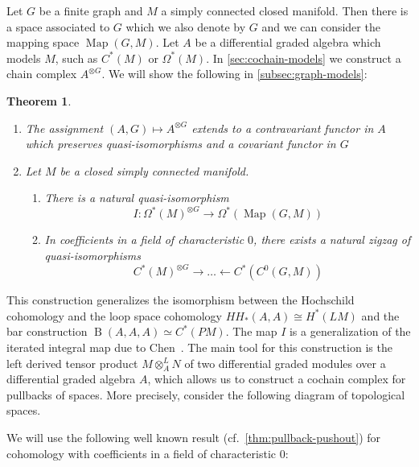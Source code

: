 \documentclass{scrartcl}
\theoremstyle{plain}
\newtheorem{theorem}{Theorem}[section]
\theoremstyle{definition}
\newcommand{\iso}{\cong}
\newcommand{\quiso}{\simeq}
\newcommand{\from}{\leftarrow}
\DeclareMathOperator{\Map}{Map}
\DeclareMathOperator{\BC}{B}
\begin{document}
Let $G$ be a finite graph and $M$ a simply connected closed manifold. Then there is a space associated to $G$ which we also denote by $G$ and we can consider the mapping space $\Map(G, M)$. Let $A$ be a differential graded algebra which models $M$, such as $C^*(M)$ or $\Omega^*(M)$. In \cref{sec:cochain-models} we construct a chain complex $A^{\otimes G}$. %
We will show the following in \cref{subsec:graph-models}: 
\begin{theorem}\label{thm:intro-graph-model}
    \begin{enumerate}
        \item The assignment $(A, G)\mapsto A^{\otimes G}$ extends to a contravariant functor in $A$ which preserves quasi-isomorphisms and a covariant functor in $G$ 
        \item Let $M$ be a closed simply connected manifold.
        \begin{enumerate}
            \item There is a natural quasi-isomorphism $$I\colon \Omega^*(M)^{\otimes G}\to \Omega^*(\Map(G, M))$$
            \item In coefficients in a field of characteristic $0$, there exists a natural zigzag of quasi-isomorphisms $$C^*(M)^{\otimes G}\to\dots\from C^*(C^0(G, M))$$
        \end{enumerate}
    \end{enumerate}
\end{theorem}
This construction generalizes the isomorphism between the Hochschild cohomology and the loop space cohomology $HH_*(A, A)\iso H^*(LM)$ and the bar construction $\BC(A, A, A) \quiso C^*(PM)$. The map $I$ is a generalization of the iterated integral map due to Chen~\cite{chen1977iterated}. The main tool for this construction is the left derived tensor product $M\otimes^L_A N$ of two differential graded modules over a differential graded algebra $A$, which allows us to construct a cochain complex for pullbacks of spaces. More precisely, consider the following diagram of topological spaces.
\begin{center}
\end{center}
We will use the following well known result (cf.\ \cref{thm:pullback-pushout}) for cohomology with coefficients in a field of characteristic $0$:
\end{document}
